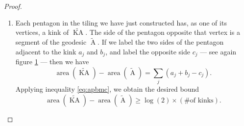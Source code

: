 \documentclass[a4paper,11pt]{article}
\renewcommand{\tilde}{\widetilde}
\newcommand{\area}{\operatorname{area}}
\newcommand{\KA}{\operatorname{KA}}
\newcommand{\A}{\operatorname{A}}
\begin{document}
\begin{proof}
\begin{enumerate}[(1)]
        The segment $\eta_{j+1}$, since it stems off of $\eta_j$ \emph{before} reaching $\rho_j$, must have the property that the boundary segment $\phi(\eta_{j+1})$ extends beyond the boundary segment lying clockwise between $p$ and $q$. See figure \ref{fig:connecting-lines-poincare-disk} for a sketch. This contradicts part (1) of this proof; we conclude that $\rho_j$ must intersect $\eta_j$.
        
        Tiling the homotopy region between $\tilde{\KA}$ and $\tilde{\A}$ is now simple. We draw all of the geodesic segments $\{\rho_j\}$ that lie orthogonally between $\tilde{\A}$ and the $\tilde{\KA}$ segments $\{\eta_j\}$; the tiles divided by these geodesics, sketched in figure \ref{fig:pentagon-tiles-poincare-disk}, are all hyperbolic right-angled pentagons, possibly with the last tiles in the sequence being degenerate right-angled pentagons if $\{\eta_j\}$ is a finite or half-finite sequence.
        
        \begin{figure}
            \centering
            \texttt{[image: pentagon-tiles-poincare-disk.pdf]}
            \caption{A pentagonal tiling of the homotopy region between the two curves originally sketched in figure \ref{fig:krt-poincare-disk}, formed by drawing the orthogonal geodesic segments joining each segment of $\tilde{\KA}$ to $\tilde{\A}$. Every intersection in this figure is right-angled, except for the two intersections at infinity.}
            \label{fig:pentagon-tiles-poincare-disk}
        \end{figure}
        
        \item 
        Each pentagon in the tiling we have just constructed has, as one of its vertices, a kink of $\tilde{\KA}$. The side of the pentagon opposite that vertex is a segment of the geodesic $\tilde{\A}$. If we label the two sides of the pentagon adjacent to the kink $a_j$ and $b_{j}$, and label the opposite side $c_j$ --- see again figure \ref{fig:pentagon-tiles-poincare-disk} --- then we have
        \begin{equation}
            \area(\tilde{\KA}) - \area(\tilde{\A})
                = \sum_{j} (a_j + b_j - c_j).
        \end{equation}
        Applying inequality \eqref{eq:apbmc}, we obtain the desired bound
    \begin{equation}
            \area(\tilde{\KA}) - \area(\tilde{\A})
                \geq \log(2) \times (\text{\# of kinks}).
        \end{equation}
        
    \end{enumerate}
\end{proof}
\end{document}
